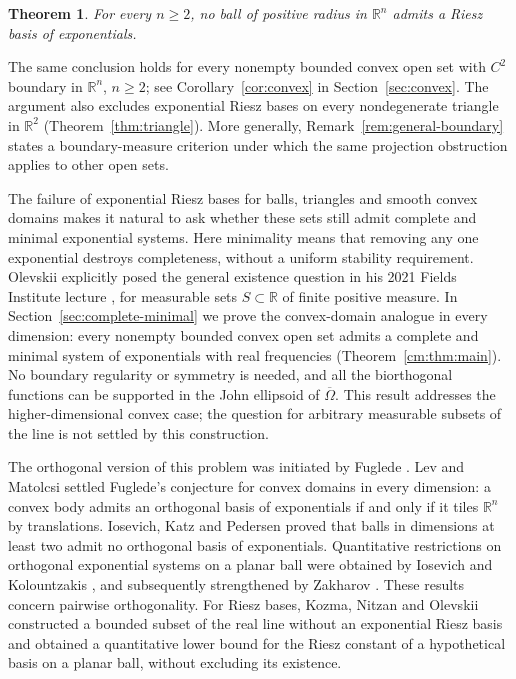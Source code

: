 \documentclass[a4paper,12pt,reqno]{amsart}
\newtheorem{theorem}{Theorem}[section]
\theoremstyle{remark}
\numberwithin{equation}{section}
\newcommand{\R}{\mathbb R}
\begin{document}
\begin{theorem}\label{thm:ball}
For every $n\geq2$, no ball of positive radius in $\R^n$ admits a Riesz basis of exponentials.
\end{theorem}

The same conclusion holds for every nonempty bounded convex open set
with $C^2$ boundary in $\R^n$, $n\geq2$; see Corollary~\ref{cor:convex} in
Section~\ref{sec:convex}.
The argument also excludes exponential Riesz bases on every nondegenerate
triangle in $\R^2$ (Theorem~\ref{thm:triangle}).  More generally, Remark~\ref{rem:general-boundary} states a
boundary-measure criterion under which the same projection obstruction
applies to other open sets.

The failure of exponential Riesz bases for balls, triangles and smooth
convex domains makes it natural to ask whether these sets still admit
complete and minimal exponential systems. Here minimality means that
removing any one exponential destroys completeness, without a uniform
stability requirement. Olevskii explicitly posed the general existence
question in his 2021 Fields Institute lecture
\cite[Section~6, p.~7]{OlevskiiFields}, for measurable sets
$S\subset\R$ of finite positive measure. In
Section~\ref{sec:complete-minimal} we prove the convex-domain analogue in
every dimension: every nonempty bounded convex open set admits a complete
and minimal system of exponentials with real frequencies
(Theorem~\ref{cm:thm:main}). No boundary regularity or symmetry is needed,
and all the biorthogonal functions can be supported in the John ellipsoid
of $\overline\Omega$. This result addresses the higher-dimensional convex
case; the question for arbitrary measurable subsets of the line is not
settled by this construction.

The orthogonal version of this problem was initiated by
Fuglede \cite{Fuglede}.  Lev and Matolcsi \cite{LevMatolcsi} settled
Fuglede's conjecture for convex domains in every dimension: a convex body
admits an orthogonal basis of exponentials if and only if it tiles $\R^n$
by translations.  Iosevich, Katz and Pedersen
\cite{IosevichKatzPedersen} proved that balls in dimensions at least two
admit no orthogonal basis of exponentials.  Quantitative restrictions on
orthogonal exponential systems on a planar ball were obtained by Iosevich and
Kolountzakis \cite{IosevichKolountzakis}, and subsequently strengthened by
Zakharov \cite{Zakharov}.  These results concern pairwise orthogonality.
For Riesz bases, Kozma, Nitzan and Olevskii \cite{KozmaNitzanOlevskii}
constructed a bounded subset of the real line without an exponential
Riesz basis and obtained a quantitative lower bound for the Riesz constant
of a hypothetical basis on a planar ball, without excluding its existence.
\end{document}
